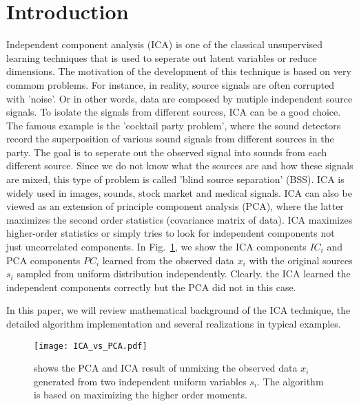 \documentclass[aps,prl,preprint,superscriptaddress]{revtex4-2}
\begin{document}
\section{Introduction}
Independent component analysis (ICA) is one of the classical unsupervised learning techniques that is used to seperate out latent variables or reduce dimensions. The motivation of the development of this technique is based on very commom problems. For instance, in reality, source signals are often corrupted with 'noise'. Or in other words, data are composed by mutiple independent source signals. To isolate the signals from different sources, ICA can be a good choice. The famous example is the 'cocktail party problem', where the sound detectors record the superposition of various sound signals from different sources in the party. The goal is to seperate out the observed signal into sounds from each different source. Since we do not know what the sources are and how these signals are mixed, this type of problem is called 'blind source separation' (BSS). ICA is widely used in images, sounds, stock market and medical signals. ICA can also be viewed as an extension of principle component analysis (PCA), where the latter maximizes the second order statistics (covariance matrix of data). ICA maximizes higher-order statistics or simply tries to look for independent components not just uncorrelated components. In Fig.~\ref{fig:ICA_vs_PCA}, we show the ICA components $IC_{i}$ and PCA components $PC_{i}$ learned from the observed data $x_{i}$ with the original sources $s_{i}$ sampled from uniform distribution independently. Clearly. the ICA learned the independent components correctly but the PCA did not in this case. 

In this paper, we will review mathematical background of the ICA technique, the detailed algorithm implementation and several realizations in typical examples. 

\begin{figure}[b]
\texttt{[image: ICA\_vs\_PCA.pdf]}
 \caption{\label{fig:ICA_vs_PCA} shows the PCA and ICA result of unmixing the observed data $x_{i}$ generated from two independent uniform variables $s_{i}$. The algorithm is based on maximizing the higher order moments. }
\end{figure}
\end{document}
